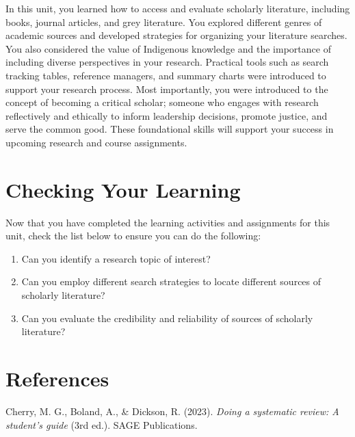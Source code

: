 \documentclass[
  letterpaper,
  DIV=11,
  numbers=noendperiod]{scrreprt}
\providecommand{\tightlist}{%
  \setlength{\itemsep}{0pt}\setlength{\parskip}{0pt}}\usepackage{longtable,booktabs,array}
\begin{document}

In this unit, you learned how to access and evaluate scholarly
literature, including books, journal articles, and grey literature. You
explored different genres of academic sources and developed strategies
for organizing your literature searches. You also considered the value
of Indigenous knowledge and the importance of including diverse
perspectives in your research. Practical tools such as search tracking
tables, reference managers, and summary charts were introduced to
support your research process. Most importantly, you were introduced to
the concept of becoming a critical scholar; someone who engages with
research reflectively and ethically to inform leadership decisions,
promote justice, and serve the common good. These foundational skills
will support your success in upcoming research and course assignments.

\section*{Checking Your Learning}\label{checking-your-learning-2}


Now that you have completed the learning activities and assignments for
this unit, check the list below to ensure you can do the following:

\begin{enumerate}
\def\labelenumi{\arabic{enumi}.}
\tightlist
\item
  Can you identify a research topic of interest?
\item
  Can you employ different search strategies to locate different sources
  of scholarly literature?
\item
  Can you evaluate the credibility and reliability of sources of
  scholarly literature?
\end{enumerate}

\section*{References}\label{references-3}


Cherry, M. G., Boland, A., \& Dickson, R. (2023). \emph{Doing a
systematic review: A student's guide} (3rd ed.). SAGE Publications.
\end{document}
